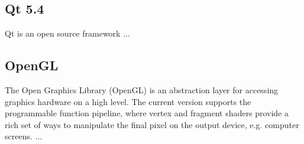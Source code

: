 \subsection{Qt 5.4}

Qt is an open source framework ...

\subsection{OpenGL}

The Open Graphics Library (OpenGL) is an abstraction layer for accessing graphics hardware on a high level. The current version supports the programmable function pipeline, where vertex and fragment shaders provide a rich set of ways to manipulate the final pixel on the output device, e.g. computer screens. ...